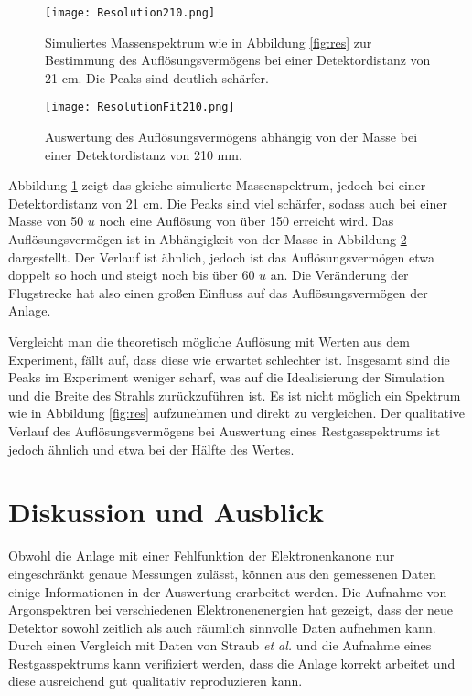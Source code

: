 \begin{figure}
    \centering
    \texttt{[image: Resolution210.png]}
    \caption[Simuliertes Massenspektrum (1–60 u, 210 mm) zur Auflösungsbestimmung]{Simuliertes Massenspektrum wie in Abbildung \ref{fig:res} zur Bestimmung des Auflösungsvermögens bei einer Detektordistanz von 21 cm. Die Peaks sind deutlich schärfer.}
    \label{fig:res21}
\end{figure}

\begin{figure}
    \centering
    \texttt{[image: ResolutionFit210.png]}
    \caption[Auswertung des Auflösungsvermögens abhängig von der Masse (210 mm)]{Auswertung des Auflösungsvermögens abhängig von der Masse bei einer Detektordistanz von 210 mm.}
    \label{fig:res_fit210}
\end{figure}

Abbildung \ref{fig:res21} zeigt das gleiche simulierte Massenspektrum, jedoch bei einer Detektordistanz von 21 cm. Die Peaks sind viel schärfer, sodass auch bei einer Masse von 50 $u$ noch eine Auflösung von über 150 erreicht wird. Das Auflösungsvermögen ist in Abhängigkeit von der Masse in Abbildung \ref{fig:res_fit210} dargestellt. Der Verlauf ist ähnlich, jedoch ist das Auflösungsvermögen etwa doppelt so hoch und steigt noch bis über 60 $u$ an. Die Veränderung der Flugstrecke hat also einen großen Einfluss auf das Auflösungsvermögen der Anlage.

Vergleicht man die theoretisch mögliche Auflösung mit Werten aus dem Experiment, fällt auf, dass diese wie erwartet schlechter ist. Insgesamt sind die Peaks im Experiment weniger scharf, was auf die Idealisierung der Simulation und die Breite des Strahls zurückzuführen ist. Es ist nicht möglich ein Spektrum wie in Abbildung \ref{fig:res} aufzunehmen und direkt zu vergleichen. Der qualitative Verlauf des Auflösungsvermögens bei Auswertung eines Restgasspektrums ist jedoch ähnlich und etwa bei der Hälfte des Wertes.


\section{Diskussion und Ausblick}
Obwohl die Anlage mit einer Fehlfunktion der Elektronenkanone nur eingeschränkt genaue Messungen zulässt, können aus den gemessenen Daten einige Informationen in der Auswertung erarbeitet werden. Die Aufnahme von Argonspektren bei verschiedenen Elektronenenergien hat gezeigt, dass der neue Detektor sowohl zeitlich als auch räumlich sinnvolle Daten aufnehmen kann. Durch einen Vergleich mit Daten von Straub \textit{et al.} \cite{Straub} und die Aufnahme eines Restgasspektrums kann verifiziert werden, dass die Anlage korrekt arbeitet und diese ausreichend gut qualitativ reproduzieren kann. 

